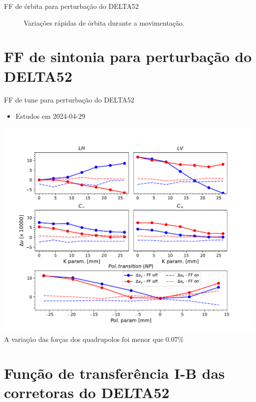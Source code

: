 \documentclass[aspectratio=169]{beamer}            %
\begin{document}
\begin{frame}{FF de órbita para perturbação do DELTA52}
\begin{figure}[ht]
\begin{minipage}[b]{0.45\linewidth}
            \caption{Variações rápidas de órbita durante a movimentação.}
            \label{fig:b}
        \end{minipage}
    \end{figure}

\end{frame}



\section{FF de sintonia para perturbação do DELTA52}

\begin{frame}{FF de tune para perturbação do DELTA52}

\begin{itemize}
    \item Estudos em 2024-04-29
\end{itemize}
\centering
\includegraphics[scale=0.4]{2024-05-31/figures/Tune_deviation.pdf}
A variação das forças dos quadrupolos foi menor que $0.07 \%$
\end{frame}



\section{Função de transferência I-B das corretoras do DELTA52}
\end{document}
